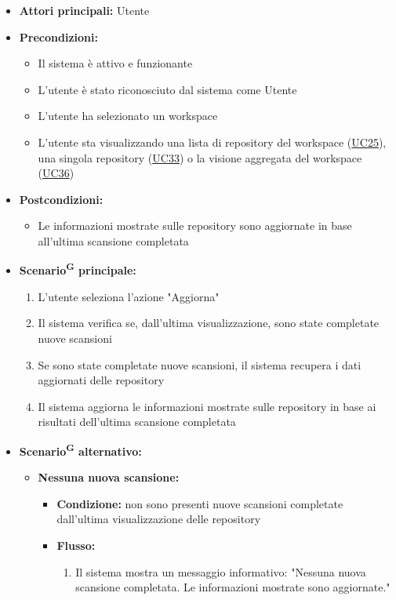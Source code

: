\documentclass[a4paper, 11pt]{article}
\begin{document}
\begin{itemize}
	\item \textbf{Attori principali:} Utente
	\item \textbf{Precondizioni:}
	\begin{itemize}
		\item Il sistema è attivo e funzionante
		\item L'utente è stato riconosciuto dal sistema come Utente
		\item L'utente ha selezionato un workspace
		\item L'utente sta visualizzando una lista di repository del workspace (\hyperref[UC25]{UC25}), una singola repository (\hyperref[UC33]{UC33}) o la visione aggregata del workspace (\hyperref[UC36]{UC36})
	\end{itemize}
	\item \textbf{Postcondizioni:}
	\begin{itemize}
		\item Le informazioni mostrate sulle repository sono aggiornate in base all'ultima scansione completata
	\end{itemize}
	\item \textbf{Scenario\textsuperscript{G} principale:}
	\begin{enumerate}
		\item L'utente seleziona l'azione "Aggiorna"
		\item Il sistema verifica se, dall'ultima visualizzazione, sono state completate nuove scansioni
		\item Se sono state completate nuove scansioni, il sistema recupera i dati aggiornati delle repository
		\item Il sistema aggiorna le informazioni mostrate sulle repository in base ai risultati dell'ultima scansione completata
	\end{enumerate}
	\item \textbf{Scenario\textsuperscript{G} alternativo:}
	\begin{itemize}
		\item \textbf{Nessuna nuova scansione:}
			\begin{itemize}
				\item \textbf{Condizione:} non sono presenti nuove scansioni completate dall'ultima visualizzazione delle repository
				\item \textbf{Flusso:}
				\begin{enumerate}
					\item Il sistema mostra un messaggio informativo: "Nessuna nuova scansione completata. Le informazioni mostrate sono aggiornate."

\end{enumerate}
\end{itemize}
\end{itemize}
\end{itemize}
\end{document}

